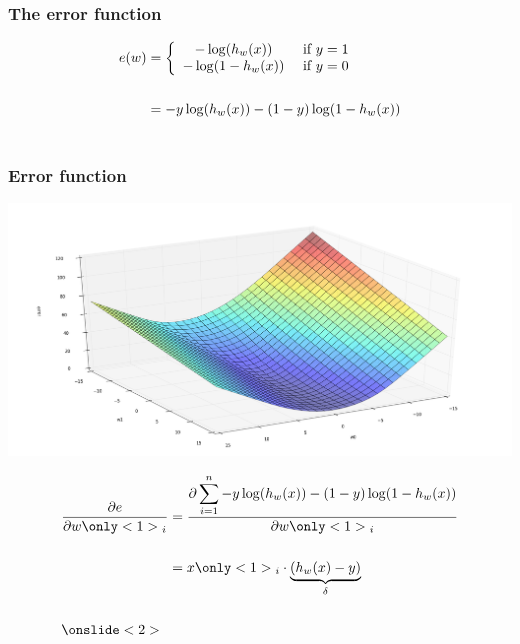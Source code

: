   \begin{frame}
    \frametitle{The error function}
    \begin{center}
      \begin{equation*}
        \begin{split}
          e(w) & =
          \left \{
            \begin{array}{cl}
              -\log(h_w(x)) & $ if $ y = 1\\
              -\log(1 - h_w(x)) & $ if $ y = 0
            \end{array}
            \right.\\~\\
            & = -y \log(h_w(x)) - (1 - y) \log(1 - h_w(x))\\~\\
          \end{split}
        \end{equation*}
      \end{center}
    \end{frame}

    \begin{frame}
      \frametitle{Error function}
      \begin{center}
        \includegraphics[scale=0.22]{./pictures/error_function.png}
      \end{center}
    \end{frame}

    \begin{frame}
      \begin{equation*}
        \begin{split}
          \frac{\partial e}{\partial w\only<1>{_i}} & = \frac{\partial \displaystyle\sum_{i =
        1}^n{-y \log(h_w(x)) - (1 - y) \log(1 -
      h_w(x)})}{\partial w\only<1>{_i}} \\~\\
      & = x\only<1>{_i} \cdot \underbrace{(h_w(x) - y)}_{\delta}\\~\\
      \onslide<2>{~}
\end{split}
  \end{equation*}
\end{frame}

